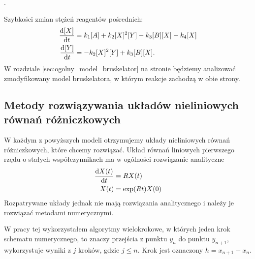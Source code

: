 \documentclass[10pt, a4paper, twoside, onecolumn]{article}
\numberwithin{equation}{section}
\begin{document}
	\begin{center}
		.
	\end{center}
	Szybkości zmian stężeń reagentów pośrednich: 
	\begin{equation}\label{bruskelator_pochodne}
	\begin{split}
		\dv{[X]}{t} &= k_{1}[A]+k_{2}[X]^{2}[Y]-k_{3}[B][X]-k_{4}[X] \\
		\dv{[Y]}{t} &= -k_{2}[X]^{2}[Y]+k_{3}[B][X].
	\end{split}
	\end{equation}
	W rozdziale \ref{sec:ogolny_model_bruskelator} na stronie \pageref{sec:ogolny_model_bruskelator} będziemy analizować zmodyfikowany model bruskelatora, w którym reakcje zachodzą w obie strony. 
	
	\subsection{Metody rozwiązywania układów nieliniowych równań różniczkowych}
	W każdym z powyższych modeli otrzymujemy układy nieliniowych równań różniczkowych, które chcemy rozwiązać. 
	Układ równań liniowych pierwszego rzędu o stałych współczynnikach ma w ogólności rozwiązanie analityczne \cite{palczewski}
	\begin{equation}
	\begin{split}
		\dv{X(t)}{t} &= RX(t) \\
		X(t) &= \exp(Rt)X(0)
	\end{split}
	\end{equation}
	Rozpatrywane układy jednak nie mają rozwiązania analitycznego i należy je rozwiązać metodami numerycznymi. \par
	W pracy tej wykorzystałem algorytmy wielokrokowe, w których jeden krok schematu numerycznego, to znaczy przejścia z punktu \(y_{n}\) do punktu \(y_{n+1}\), wykorzystuje wyniki z \(j\) kroków, gdzie \(j\leq n\). Krok jest oznaczony \(h=x_{n+1}-x_{n}\). \par
	
\end{document}
